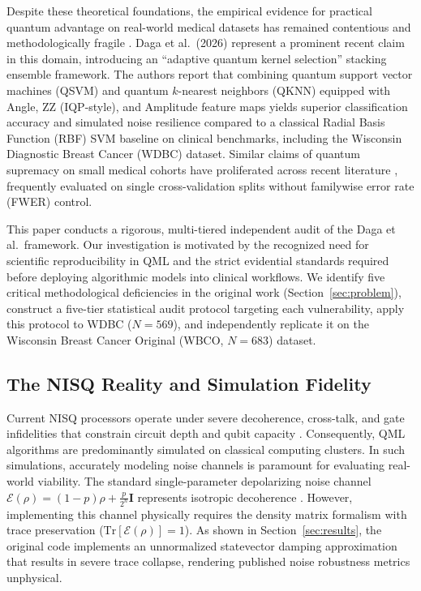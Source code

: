 \documentclass[journal,twocolumn]{IEEEtran}
\begin{document}
Despite these theoretical foundations, the empirical evidence for practical quantum advantage on real-world medical datasets has remained contentious and methodologically fragile \cite{krol2022variational,cerezo2021variational}. Daga et al.\ (2026) \cite{daga2026adaptive} represent a prominent recent claim in this domain, introducing an ``adaptive quantum kernel selection'' stacking ensemble framework. The authors report that combining quantum support vector machines (QSVM) and quantum $k$-nearest neighbors (QKNN) equipped with Angle, ZZ (IQP-style), and Amplitude feature maps yields superior classification accuracy and simulated noise resilience compared to a classical Radial Basis Function (RBF) SVM baseline on clinical benchmarks, including the Wisconsin Diagnostic Breast Cancer (WDBC) dataset. Similar claims of quantum supremacy on small medical cohorts have proliferated across recent literature \cite{li2015experimental,altares2021automatic}, frequently evaluated on single cross-validation splits without familywise error rate (FWER) control.

This paper conducts a rigorous, multi-tiered independent audit of the Daga et al.\ framework. Our investigation is motivated by the recognized need for scientific reproducibility in QML \cite{krol2022variational} and the strict evidential standards required before deploying algorithmic models into clinical workflows. We identify five critical methodological deficiencies in the original work (Section~\ref{sec:problem}), construct a five-tier statistical audit protocol targeting each vulnerability, apply this protocol to WDBC ($N=569$), and independently replicate it on the Wisconsin Breast Cancer Original (WBCO, $N=683$) dataset.

\subsection{The NISQ Reality and Simulation Fidelity}

Current NISQ processors operate under severe decoherence, cross-talk, and gate infidelities that constrain circuit depth and qubit capacity \cite{preskill2018quantum}. Consequently, QML algorithms are predominantly simulated on classical computing clusters. In such simulations, accurately modeling noise channels is paramount for evaluating real-world viability. The standard single-parameter depolarizing noise channel $\mathcal{E}(\rho) = (1-p)\rho + \frac{p}{2^n}\mathbf{I}$ represents isotropic decoherence \cite{nielsen2010quantum}. However, implementing this channel physically requires the density matrix formalism with trace preservation ($\text{Tr}[\mathcal{E}(\rho)]=1$). As shown in Section~\ref{sec:results}, the original code implements an unnormalized statevector damping approximation that results in severe trace collapse, rendering published noise robustness metrics unphysical.
\end{document}
